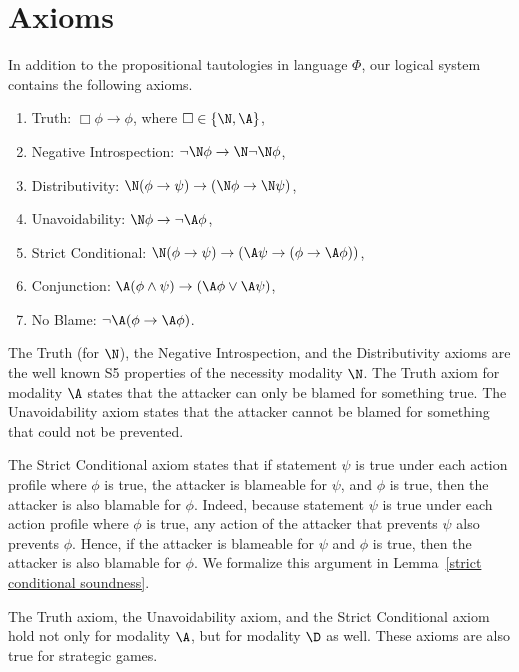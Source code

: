 \documentclass[letterpaper]{article}
\begin{document}
\section{Axioms}\label{axioms section}

In addition to the propositional tautologies in  language $\Phi$, our logical system contains the following axioms.


\begin{enumerate}
\item Truth: $\Box\phi\to\phi$, where $\Box\in\{\N,\A\}$,
\item Negative Introspection: $\neg\N\phi\to\N\neg\N\phi$,
\item Distributivity:
$\N(\phi\to\psi)\to(\N\phi\to\N\psi)$,
\item Unavoidability: $\N\phi\to\neg\A\phi$,
\item Strict Conditional:  $\N(\phi\to\psi)\to(\A\psi\to(\phi\to \A\phi))$,
\item Conjunction: $\A(\phi\wedge\psi)\to(\A\phi\vee\A\psi)$,
\item No Blame: $\neg\A(\phi\to\A\phi)$.
\end{enumerate}

The Truth (for $\N$), the Negative Introspection, and the Distributivity axioms are the well known S5 properties of the necessity modality $\N$. The Truth axiom for modality $\A$ states that the attacker can only be blamed for something true. The Unavoidability axiom states that the attacker cannot be blamed for something that could not be prevented.

The Strict Conditional axiom states that if statement $\psi$ is true under each action profile where $\phi$ is true, the attacker is blameable for $\psi$, and $\phi$ is true, then the attacker is also blamable for $\phi$. Indeed, because statement $\psi$ is true under each action profile where $\phi$ is true, any action of the attacker that prevents $\psi$ also prevents $\phi$. Hence, if the attacker is blameable for $\psi$ and $\phi$ is true, then the attacker is also blamable for $\phi$. We formalize this argument in Lemma~\ref{strict conditional soundness}.

The Truth axiom, the Unavoidability axiom, and the Strict Conditional axiom hold not only for modality $\A$, but for modality $\D$ as well. These axioms are also true for strategic games.
\end{document}
